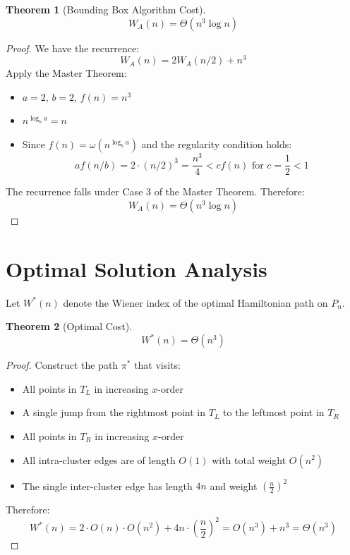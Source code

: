 \documentclass{article}
\newtheorem{theorem}{Theorem}
\begin{document}
\begin{theorem}[Bounding Box Algorithm Cost]
\[
    W_A(n) = \Theta(n^3 \log n)
\]
\end{theorem}

\begin{proof}
We have the recurrence:
\[
    W_A(n) = 2W_A(n/2) + n^3
\]
Apply the Master Theorem:
\begin{itemize}
    \item $a = 2$, $b = 2$, $f(n) = n^3$
    \item $n^{\log_b a} = n$
    \item Since $f(n) = \omega(n^{\log_b a})$ and the regularity condition holds:
    \[
        af(n/b) = 2 \cdot (n/2)^3 = \frac{n^3}{4} < cf(n) \text{ for } c = \frac{1}{2} < 1
    \]
\end{itemize}
The recurrence falls under Case 3 of the Master Theorem. Therefore:
\[
    W_A(n) = \Theta(n^3 \log n)
\]
\end{proof}

\section{Optimal Solution Analysis}

Let $W^*(n)$ denote the Wiener index of the optimal Hamiltonian path on $P_n$.

\begin{theorem}[Optimal Cost]
\[
    W^*(n) = \Theta(n^3)
\]
\end{theorem}

\begin{proof}
Construct the path $\pi^*$ that visits:
\begin{itemize}
    \item All points in $T_L$ in increasing $x$-order
    \item A single jump from the rightmost point in $T_L$ to the leftmost point in $T_R$
    \item All points in $T_R$ in increasing $x$-order
\end{itemize}
\begin{itemize}
    \item All intra-cluster edges are of length $O(1)$ with total weight $O(n^2)$
    \item The single inter-cluster edge has length $4n$ and weight $\left(\frac{n}{2}\right)^2$
\end{itemize}
Therefore:
\[
    W^*(n) = 2 \cdot O(n) \cdot O(n^2) + 4n \cdot \left(\frac{n}{2}\right)^2 = O(n^3) + n^3 = \Theta(n^3)
\]
\end{proof}
\end{document}
